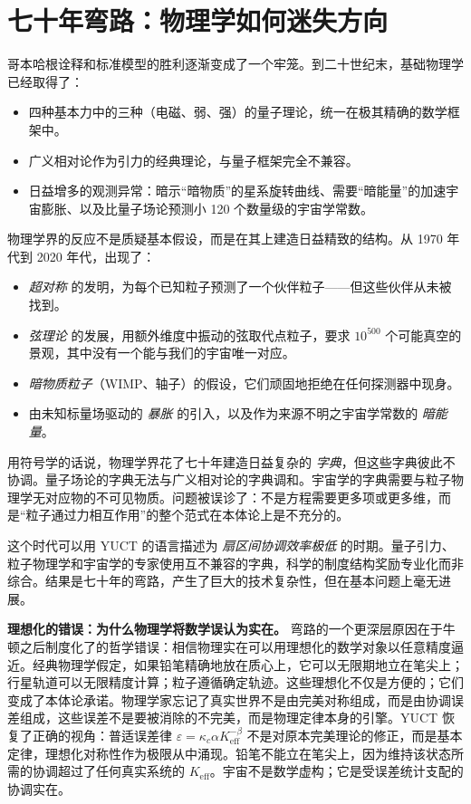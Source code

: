 \documentclass[12pt,a4paper]{article}
\begin{document}
	\section{七十年弯路：物理学如何迷失方向}
	
	哥本哈根诠释和标准模型的胜利逐渐变成了一个牢笼。到二十世纪末，基础物理学已经取得了：
	\begin{itemize}
		\item 四种基本力中的三种（电磁、弱、强）的量子理论，统一在极其精确的数学框架中。
		\item 广义相对论作为引力的经典理论，与量子框架完全不兼容。
		\item 日益增多的观测异常：暗示“暗物质”的星系旋转曲线、需要“暗能量”的加速宇宙膨胀、以及比量子场论预测小 120 个数量级的宇宙学常数。
	\end{itemize}
	
	物理学界的反应不是质疑基本假设，而是在其上建造日益精致的结构。从 1970 年代到 2020 年代，出现了：
	\begin{itemize}
		\item \emph{超对称} 的发明，为每个已知粒子预测了一个伙伴粒子——但这些伙伴从未被找到。
		\item \emph{弦理论} 的发展，用额外维度中振动的弦取代点粒子，要求 \(10^{500}\) 个可能真空的景观，其中没有一个能与我们的宇宙唯一对应。
		\item \emph{暗物质粒子}（WIMP、轴子）的假设，它们顽固地拒绝在任何探测器中现身。
		\item 由未知标量场驱动的 \emph{暴胀} 的引入，以及作为来源不明之宇宙学常数的 \emph{暗能量}。
	\end{itemize}
	
	用符号学的话说，物理学界花了七十年建造日益复杂的 \emph{字典}，但这些字典彼此不协调。量子场论的字典无法与广义相对论的字典调和。宇宙学的字典需要与粒子物理学无对应物的不可见物质。问题被误诊了：不是方程需要更多项或更多维，而是“粒子通过力相互作用”的整个范式在本体论上是不充分的。
	
	这个时代可以用 YUCT 的语言描述为 \emph{扇区间协调效率极低} 的时期。量子引力、粒子物理学和宇宙学的专家使用互不兼容的字典，科学的制度结构奖励专业化而非综合。结果是七十年的弯路，产生了巨大的技术复杂性，但在基本问题上毫无进展。
	
	\textbf{理想化的错误：为什么物理学将数学误认为实在。} 弯路的一个更深层原因在于牛顿之后制度化了的哲学错误：相信物理实在可以用理想化的数学对象以任意精度逼近。经典物理学假定，如果铅笔精确地放在质心上，它可以无限期地立在笔尖上；行星轨道可以无限精度计算；粒子遵循确定轨迹。这些理想化不仅是方便的；它们变成了本体论承诺。物理学家忘记了真实世界不是由完美对称组成，而是由协调误差组成，这些误差不是要被消除的不完美，而是物理定律本身的引擎。YUCT 恢复了正确的视角：普适误差律 \(\varepsilon = \kappa_c \alpha K_{\mathrm{eff}}^{-\beta}\) 不是对原本完美理论的修正，而是基本定律，理想化对称性作为极限从中涌现。铅笔不能立在笔尖上，因为维持该状态所需的协调超过了任何真实系统的 \(K_{\mathrm{eff}}\)。宇宙不是数学虚构；它是受误差统计支配的协调实在。
	
\end{document}
